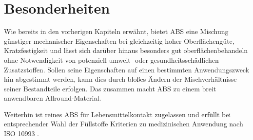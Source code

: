     \section{Besonderheiten}
            Wie bereits in den vorherigen Kapiteln erwähnt, bietet ABS eine Mischung günstiger mechanischer Eigenschaften
            bei gleichzeitig hoher Oberflächengüte, Kratzfestigkeit und lässt sich darüber hinaus besonders gut oberflächenbehandeln
            ohne  Notwendigkeit von potenziell umwelt- oder gesundheitsschädlichen Zusatzstoffen. Sollen seine
            Eigenschaften auf einen bestimmten Anwendungszweck hin abgestimmt werden, kann dies durch bloßes Ändern der
            Mischverhältnisse seiner Bestandteile erfolgen. Das zusammen macht ABS zu einem breit anwendbaren Allround-Material.

            Weiterhin ist reines ABS für Lebensmittelkontakt zugelassen und erfüllt bei entsprechender Wahl der Füllstoffe
            Kriterien zu medizinischen Anwendung nach ISO 10993 \cite{ABS.M30i.Datasheet.Stratasys.20210210}.